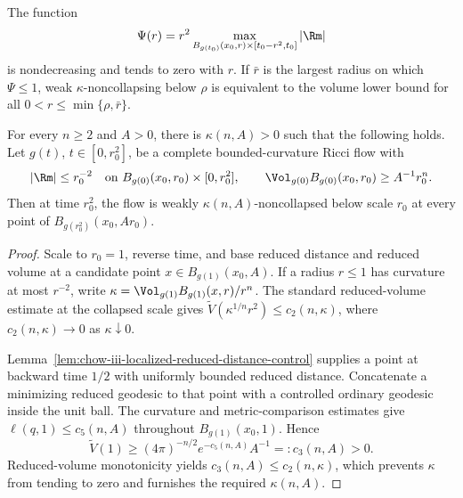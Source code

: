\begin{remark}
\label{rem:chow-iii-largest-curvature-controlled-scale}
The function
\[
 \Psi(r)=r^2\max_{B_{g(t_0)}(x_0,r)\times[t_0-r^2,t_0]}|\Rm|
\]
is nondecreasing and tends to zero with \(r\).  If \(\bar r\) is the largest
radius on which \(\Psi\le1\), weak \(\kappa\)-noncollapsing below \(\rho\) is
equivalent to the volume lower bound for all
\(0<r\le\min\{\rho,\bar r\}\).
\end{remark}

\begin{theorem}
\label{thm:chow-iii-localized-no-local-collapsing}
For every \(n\ge2\) and \(A>0\), there is \(\kappa(n,A)>0\) such that the
following holds.  Let \(g(t)\), \(t\in[0,r_0^2]\), be a complete
bounded-curvature Ricci flow with
\[
 |\Rm|\le r_0^{-2}\quad\text{on }B_{g(0)}(x_0,r_0)\times[0,r_0^2],
 \qquad \Vol_{g(0)}B_{g(0)}(x_0,r_0)\ge A^{-1}r_0^n.
\]
Then at time \(r_0^2\), the flow is weakly \(\kappa(n,A)\)-noncollapsed below
scale \(r_0\) at every point of \(B_{g(r_0^2)}(x_0,Ar_0)\).
\end{theorem}
\begin{proof}
\sketch Scale to \(r_0=1\), reverse time, and base reduced distance and reduced volume
at a candidate point \(x\in B_{g(1)}(x_0,A)\).  If a radius \(r\le1\) has
curvature at most \(r^{-2}\), write
\(\kappa=\Vol_{g(1)}B_{g(1)}(x,r)/r^n\).  The standard reduced-volume estimate
at the collapsed scale gives
\(\widetilde V(\kappa^{1/n}r^2)\le c_2(n,\kappa)\), where
\(c_2(n,\kappa)\to0\) as \(\kappa\downarrow0\).

Lemma~\ref{lem:chow-iii-localized-reduced-distance-control} supplies a point
at backward time \(1/2\) with uniformly bounded reduced distance.  Concatenate
a minimizing reduced geodesic to that point with a controlled ordinary
geodesic inside the unit ball.  The curvature and metric-comparison estimates
give \(\ell(q,1)\le c_5(n,A)\) throughout \(B_{g(1)}(x_0,1)\).  Hence
\[
 \widetilde V(1)\ge(4\pi)^{-n/2}e^{-c_5(n,A)}A^{-1}=:c_3(n,A)>0.
\]
Reduced-volume monotonicity yields
\(c_3(n,A)\le c_2(n,\kappa)\), which prevents \(\kappa\) from tending to zero
and furnishes the required \(\kappa(n,A)\).
\end{proof}

